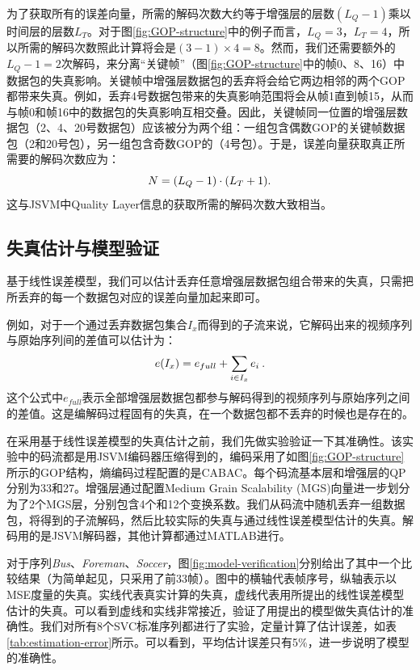为了获取所有的误差向量，所需的解码次数大约等于增强层的层数$(L_Q - 1)$乘以时间层的层数$L_T$。对于图\ref{fig:GOP-structure}中的例子而言，$L_Q = 3$，$L_T = 4$，所以所需的解码次数照此计算将会是$(3 - 1) \times 4 = 8$。然而，我们还需要额外的$L_Q - 1 = 2$次解码，来分离“关键帧”\supercite{H.264-Overview}（图\ref{fig:GOP-structure}中的帧0、8、16）中数据包的失真影响。关键帧中增强层数据包的丢弃将会给它两边相邻的两个GOP都带来失真。例如，丢弃4号数据包带来的失真影响范围将会从帧1直到帧15，从而与帧0和帧16中的数据包的失真影响互相交叠。因此，关键帧同一位置的增强层数据包（2、4、20号数据包）应该被分为两个组：一组包含偶数GOP的关键帧数据包（2和20号包），另一组包含奇数GOP的（4号包）。于是，误差向量获取真正所需要的解码次数应为：
\begin{equation}
\vspace{10pt}
N = (L_Q - 1) \cdot (L_T + 1).
\end{equation}
这与JSVM中Quality Layer信息的获取所需的解码次数大致相当。

\subsection{失真估计与模型验证}
\vspace{10pt}
\label{subsec:distortion-estimation}

基于线性误差模型，我们可以估计丢弃任意增强层数据包组合带来的失真，只需把所丢弃的每一个数据包对应的误差向量加起来即可。

例如，对于一个通过丢弃数据包集合$I_x$而得到的子流来说，它解码出来的视频序列与原始序列间的差值可以估计为：
\begin{equation}
\vspace{10pt}
\label{eq:subset_error}
e(I_x) = e_{full} + \sum_{i \in {I_x}} e_i \: .
\end{equation}
这个公式中$e_{full}$表示全部增强层数据包都参与解码得到的视频序列与原始序列之间的差值。这是编解码过程固有的失真，在一个数据包都不丢弃的时候也是存在的。

在采用基于线性误差模型的失真估计之前，我们先做实验验证一下其准确性。该实验中的码流都是用JSVM编码器压缩得到的，编码采用了如图\ref{fig:GOP-structure}所示的GOP结构，熵编码过程配置的是CABAC。每个码流基本层和增强层的QP分别为33和27。增强层通过配置Medium Grain Scalability (MGS)向量进一步划分为了2个MGS层，分别包含4个和12个变换系数。我们从码流中随机丢弃一组数据包，将得到的子流解码，然后比较实际的失真与通过线性误差模型估计的失真。解码用的是JSVM解码器，其他计算都通过MATLAB进行。

对于序列{\em Bus}、{\em Foreman}、{\em Soccer}，图\ref{fig:model-verification}分别给出了其中一个比较结果（为简单起见，只采用了前33帧）。图中的横轴代表帧序号，纵轴表示以MSE度量的失真。实线代表真实计算的失真，虚线代表用所提出的线性误差模型估计的失真。可以看到虚线和实线非常接近，验证了用提出的模型做失真估计的准确性。我们对所有8个SVC标准序列都进行了实验，定量计算了估计误差，如表\ref{tab:estimation-error}所示。可以看到，平均估计误差只有5\%，进一步说明了模型的准确性。


